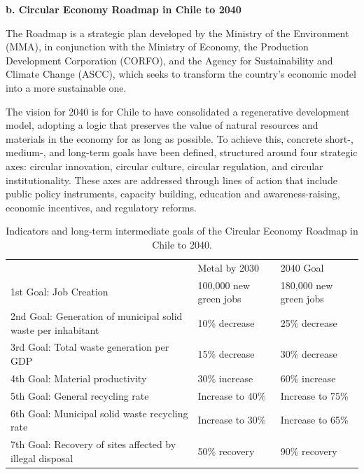 \documentclass[
  12pt,
  oneside]{book}
\begin{document}
\textbf{b. Circular Economy Roadmap in Chile to 2040}

The Roadmap is a strategic plan developed by the Ministry of the
Environment (MMA), in conjunction with the Ministry of Economy, the
Production Development Corporation (CORFO), and the Agency for
Sustainability and Climate Change (ASCC), which seeks to transform the
country's economic model into a more sustainable one.

The vision for 2040 is for Chile to have consolidated a regenerative
development model, adopting a logic that preserves the value of natural
resources and materials in the economy for as long as possible. To
achieve this, concrete short-, medium-, and long-term goals have been
defined, structured around four strategic axes: circular innovation,
circular culture, circular regulation, and circular institutionality.
These axes are addressed through lines of action that include public
policy instruments, capacity building, education and awareness-raising,
economic incentives, and regulatory reforms.

\begin{table}[H]
\caption{Indicators and long-term intermediate goals of the Circular Economy Roadmap in Chile to 2040.}
\begin{tabular}{p{7cm}p{5cm}p{4cm}}
\rowcolor[HTML]{153D63} 
\multicolumn{1}{c}{\cellcolor[HTML]{153D63}{\color[HTML]{FFFFFF} Indicator}} & {\color[HTML]{FFFFFF} Metal by 2030} & {\color[HTML]{FFFFFF} 2040 Goal} \\
1st Goal: Job Creation                                                       & 100,000 new green jobs               & 180,000 new green jobs           \\
2nd Goal: Generation of municipal solid waste per inhabitant                 & 10\% decrease                        & 25\% decrease                    \\
3rd Goal: Total waste generation per GDP                                     & 15\% decrease                        & 30\% decrease                    \\
4th Goal: Material productivity                                              & 30\% increase                        & 60\% increase                    \\
5th Goal: General recycling rate                                             & Increase to 40\%                     & Increase to 75\%                 \\
6th Goal: Municipal solid waste recycling rate                               & Increase to 30\%                     & Increase to 65\%                 \\
7th Goal: Recovery of sites affected by illegal disposal                     & 50\% recovery                        & 90\% recovery                   
\end{tabular}
\end{table}
\end{document}
